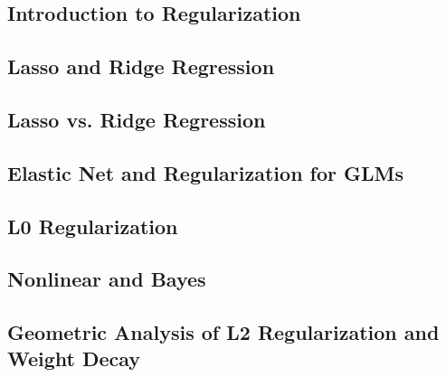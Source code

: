 

\subsection{Introduction to Regularization}


\subsection{Lasso and Ridge Regression}


\subsection{Lasso vs. Ridge Regression}


\subsection{Elastic Net and Regularization for GLMs}


%

\subsection{L0 Regularization}


\subsection{Nonlinear and Bayes}


\subsection{Geometric Analysis of L2 Regularization and Weight Decay}


